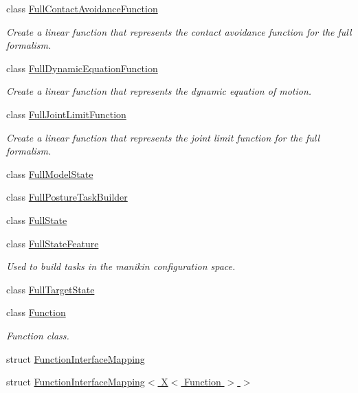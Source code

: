 \begin{DoxyCompactItemize}
class \hyperlink{classocra_1_1FullContactAvoidanceFunction}{Full\+Contact\+Avoidance\+Function}
\begin{DoxyCompactList}\small\item\em Create a linear function that represents the contact avoidance function for the full formalism. \end{DoxyCompactList}\item 
class \hyperlink{classocra_1_1FullDynamicEquationFunction}{Full\+Dynamic\+Equation\+Function}
\begin{DoxyCompactList}\small\item\em Create a linear function that represents the dynamic equation of motion. \end{DoxyCompactList}\item 
class \hyperlink{classocra_1_1FullJointLimitFunction}{Full\+Joint\+Limit\+Function}
\begin{DoxyCompactList}\small\item\em Create a linear function that represents the joint limit function for the full formalism. \end{DoxyCompactList}\item 
class \hyperlink{classocra_1_1FullModelState}{Full\+Model\+State}
\item 
class \hyperlink{classocra_1_1FullPostureTaskBuilder}{Full\+Posture\+Task\+Builder}
\item 
class \hyperlink{classocra_1_1FullState}{Full\+State}
\item 
class \hyperlink{classocra_1_1FullStateFeature}{Full\+State\+Feature}
\begin{DoxyCompactList}\small\item\em Used to build tasks in the manikin configuration space. \end{DoxyCompactList}\item 
class \hyperlink{classocra_1_1FullTargetState}{Full\+Target\+State}
\item 
class \hyperlink{classocra_1_1Function}{Function}
\begin{DoxyCompactList}\small\item\em Function class. \end{DoxyCompactList}\item 
struct \hyperlink{structocra_1_1FunctionInterfaceMapping}{Function\+Interface\+Mapping}
\item 
struct \hyperlink{structocra_1_1FunctionInterfaceMapping_3_01X_3_01Function_01_4_01_4}{Function\+Interface\+Mapping$<$ X$<$ Function $>$ $>$}
\item 

\end{DoxyCompactItemize}
